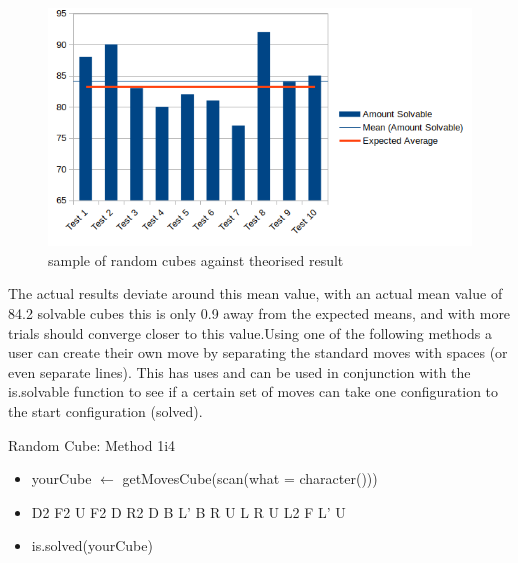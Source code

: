 \documentclass{article}
\newcounter{theo}[section]\setcounter{theo}{0}
\begin{document}
\begin{figure}
\includegraphics[scale=.8]{randomcube.png}
\caption{sample of random cubes against theorised result}
\label{fig:randomresult}
\end{figure}The actual results deviate around this mean value, with an actual mean value of 84.2 solvable cubes this is only 0.9 away from the expected means, and with more trials should converge closer to this value.\newline Using one of the following methods a user can create their own move by separating the standard moves with spaces (or even separate lines). This has uses and can be used in conjunction with the is.solvable function to see if a certain set of moves can take one configuration to the start configuration (solved).
%




\begin{myinput}{Random Cube: Method 1}{i4}
\begin{itemize}
\item yourCube $\leftarrow$ getMovesCube(scan(what = character()))
\item  D2 F2 U F2 D R2 D B L' B R U L R U L2 F L' U
\item is.solved(yourCube)
\end{itemize}
\end{myinput}
\end{document}

